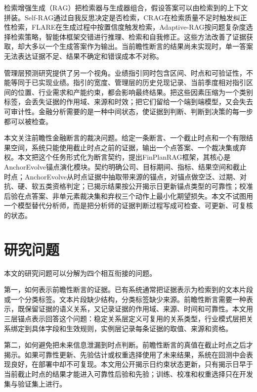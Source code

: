 检索增强生成（RAG）把检索器与生成器组合，假设答案可以由检索到的上下文拼装\citep{lewis2020rag}。Self-RAG通过自我反思决定是否检索\citep{asai2024selfrag}，CRAG在检索质量不足时触发纠正性检索\citep{yan2024crag}，FLARE在生成过程中按置信度触发检索\citep{jiang2023flare}，Adaptive-RAG按问题复杂度选择检索策略\citep{jeong2024adaptiverag}，智能体框架交错进行推理、检索和自我修正\citep{yao2023react,shinn2023reflexion}。这些方法改善了证据获取，却大多以一个生成答案作为输出。当前瞻性断言的结果尚未实现时，单一答案无法表达证据不足、结果不确定和错误成本不对称。

管理层预测研究提供了另一个视角。业绩指引同时包含区间、时点和可验证性，不能等同于已实现业绩\citep{hirst2008management}。指引的宽度、管理层的历史兑现记录、当前季度相对指引区间的位置、行业需求和产能约束，都会影响最终结果。把这些因素压缩为一个类别标签，会丢失证据的作用域、来源和时效；把它们留给一个端到端模型，又会失去可审计性。金融分析需要的是一种中间状态，使证据到判断、判断到决策的每一步都可以被检查。

本文关注前瞻性金融断言的裁决问题。给定一条断言、一个截止时点和一个有限结果空间，系统只能使用截止时点之前的证据，输出一个点答案、一个裁决集或弃权。本文把这个任务形式化为断言契约，提出FinPlanRAG框架，其核心是AnchorEvolve锚点演化模块。契约明确公司、目标期间、指标、结果空间和截止时点；AnchorEvolve从时点证据中抽取带来源的锚点，对锚点做空泛、过期、对抗、硬、软五类资格判定；已揭示结果按公开揭示日更新锚点类型的可靠性；校准后验在点答案、非单元素裁决集和弃权三个动作上最小化期望损失。本文不试图用一个模型替代分析师，而是把分析师的证据判断过程写成可检查、可更新、可复核的状态。

\section{研究问题}

本文的研究问题可以分解为四个相互衔接的问题。

第一，如何表示前瞻性断言的证据。已有系统通常把证据表示为检索到的文本片段或一个分类标签。文本片段缺少结构，分类标签缺少来源。前瞻性断言需要一种表示，既保留证据的语义关系，又记录证据的作用域、来源、时间和可靠性。本文用三层锚点表示回答这个问题：稳定关系层定义可复用的关系类型，行业模式层把关系绑定到具体字段和生效规则，实例层记录每条证据的取值、来源和资格。

第二，如何避免把未来信息泄漏到时点判断。前瞻性断言的真值在截止时点之后才揭示。如果可靠性更新、先验估计或权重选择使用了未来结果，系统在回测中会表现良好，在部署中却不可复现。本文用公开揭示日约束状态更新，只有揭示日早于当前截止时点的结果才能进入可靠性后验和先验；训练、校准和权重选择只在开发集与验证集上进行。

